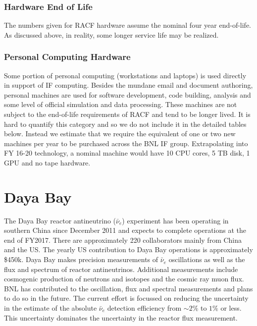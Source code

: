 \documentclass[pdftex,12pt,letter]{article}
\begin{document}
\subsubsection{Hardware End of Life}

The numbers given for RACF hardware assume the nominal four year
end-of-life.
As discussed above, in reality, some longer service life may be
realized.

\subsubsection{Personal Computing Hardware}

Some portion of personal computing (workstations and laptops) is used
directly in support of IF computing.
Besides the mundane email and document authoring, personal machines
are used for software development, code building, analysis and some
level of official simulation and data processing.
These machines are not subject to the end-of-life requirements of RACF
and tend to be longer lived.
It is hard to quantify this category and so we do not include it in
the detailed tables below. Instead we estimate that we require the
equivalent of one or two new machines per year to be purchased across
the BNL IF group.
Extrapolating into FY 16-20 technology, a nominal machine would have
10 CPU cores, 5 TB disk, 1 GPU and no tape hardware.

\pagebreak
\section{Daya Bay}

The Daya Bay reactor antineutrino ($\bar\nu_e$) experiment has been
operating in southern China since December 2011 and expects to
complete operations at the end of FY2017. There are approximately 220
collaborators mainly from China and the US. The yearly US contribution
to Daya Bay operations is approximately \$450k.
Daya Bay makes precision measurements of $\bar\nu_e$ oscillations as
well as the flux and spectrum of reactor antineutrinos. 
Additional measurements include cosmogenic production of neutrons and
isotopes and the cosmic ray muon flux. 
BNL has contributed to the oscillation, flux and spectral measurements
and plans to do so in the future. The current effort is focussed on
reducing the uncertainty in the estimate of the absolute $\bar\nu_e$
detection efficiency from $\sim\!2\%$ to $1\%$ or less. This
uncertainty dominates the uncertainty in the reactor flux measurement. 
\end{document}
